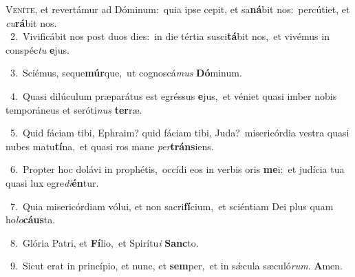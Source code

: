 \lettrine{\initial\textcolor{\initialcolor}{V}}{eníte,} et revertámur ad Dóminum:~\dagger quia ipse cepit, et sa\-\textbf{ná}\-bit nos:~\star percútiet, et \textit{cu}\-\textbf{rá}bit nos.\\
{\numbfont\textcolor{\numbcolor}{~2.}}~Vivificábit nos post duos dies:~\dagger in die tértia susci\-\textbf{tá}\-bit nos,~\star et vivémus in conspéc\textit{tu} \textbf{e}\-jus.\par
{\numbfont\textcolor{\numbcolor}{~3.}}~Sciémus, seque\-\textbf{múr}\-que,~\star ut cognoscá\textit{mus} \textbf{Dó}\-minum.\par
{\numbfont\textcolor{\numbcolor}{~4.}}~Quasi dilúculum præparátus est egréssus \textbf{e}\-jus,~\star et véniet quasi imber nobis temporáneus et seróti\textit{nus} \textbf{ter}\-ræ.\par
{\numbfont\textcolor{\numbcolor}{~5.}}~Quid fáciam tibi, Ephraim? quid fáciam tibi, Juda?~\dagger misericórdia vestra quasi nubes matu\-\textbf{tí}\-na,~\star et quasi ros mane \textit{per}\-\textbf{tráns}iens.\par
{\numbfont\textcolor{\numbcolor}{~6.}}~Propter hoc dolávi in prophétis,~\dagger occídi eos in verbis oris \textbf{me}\-i:~\star et judícia tua quasi lux egre\-\textit{di}\-\textbf{én}tur.\par
{\numbfont\textcolor{\numbcolor}{~7.}}~Quia misericórdiam vólui, et non sacri\-\textbf{fí}\-cium,~\star et sciéntiam Dei plus quam ho\-\textit{lo}\-\textbf{cáus}ta.\par
{\numbfont\textcolor{\numbcolor}{~8.}}~Glória Patri, et \textbf{Fí}\-lio,~\star et Spirítu\textit{i} \textbf{Sanc}\-to.\par
{\numbfont\textcolor{\numbcolor}{~9.}}~Sicut erat in princípio, et nunc, et \textbf{sem}\-per,~\star et in sǽcula sæculó\-\textit{rum}\-. \textbf{A}\-men.\par
